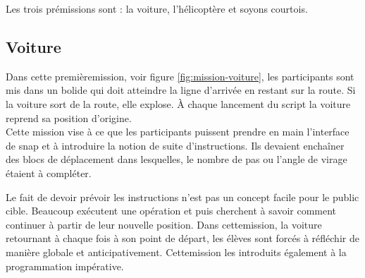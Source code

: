 Les trois pré\glspl{mission} sont : la voiture, l'hélicoptère et soyons courtois.


% 

\subsection{Voiture}
\label{mission-voiture}
Dans cette première\gls{mission}, voir figure \ref{fig:mission-voiture}, les participants sont mis dans un bolide qui doit atteindre la ligne d'arrivée en restant sur la route. Si la voiture sort de la route, elle explose. À chaque lancement du \gls{script} la voiture reprend sa position d'origine.\\

Cette \gls{mission} vise à ce que les participants puissent prendre en main l'interface de \gls{snap} et à introduire la notion de suite d'instructions. Ils devaient enchaîner des \glspl{bloc} de déplacement dans lesquelles, le nombre de pas ou l'angle de virage étaient à compléter.

Le fait de devoir prévoir les instructions n'est pas un concept facile pour le public cible. Beaucoup exécutent une opération et puis cherchent à savoir comment continuer à partir de leur nouvelle position. Dans cette\gls{mission}, la voiture retournant à chaque fois à son point de départ, les élèves sont forcés à réfléchir de manière globale et anticipativement. Cette\gls{mission} les introduits également à la programmation impérative.\\ 

